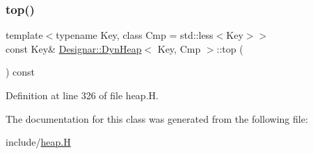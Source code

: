 \subsubsection{\texorpdfstring{top()}{top()}}
{\footnotesize\ttfamily template$<$typename Key, class Cmp = std\+::less$<$\+Key$>$$>$ \\
const Key\& \hyperlink{class_designar_1_1_dyn_heap}{Designar\+::\+Dyn\+Heap}$<$ Key, Cmp $>$\+::top (\begin{DoxyParamCaption}{ }\end{DoxyParamCaption}) const\hspace{0.3cm}{\ttfamily [inline]}}



Definition at line 326 of file heap.\+H.



The documentation for this class was generated from the following file\+:\begin{DoxyCompactItemize}
\item 
include/\hyperlink{heap_8_h}{heap.\+H}\end{DoxyCompactItemize}
